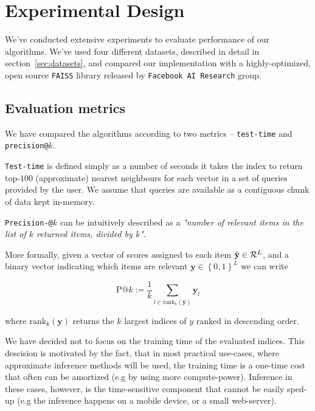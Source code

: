 
\section{Experimental Design}

    We've conducted extensive experiments to evaluate performance of our algorithms. We've used
    four different datasets, described in detail in section~\ref{sec:datasets}, and compared
    our implementation with a highly-optimized, open source \texttt{FAISS} library released by
    \texttt{Facebook AI Research} group.

    \subsection{Evaluation metrics}

        We have compared the algorithms according to two metrics -- \texttt{test-time}
        and \texttt{precision@}$k$.

        \texttt{Test-time} is defined simply as a number of seconds it takes the index to return
        top-$100$ (approximate) nearest neighbours for each vector in a set of queries provided by the user.
        We assume that queries are available as a contiguous chunk of data kept in-memory.

        \texttt{Precision-@}$k$ can be intuitively described as a
        \textit{"number of relevant items in the list of $k$ returned items, divided by $k$".}

        More formally, given a vector of scores assigned to each item $\hat{\mathbf y} \in {\cal{R}}^{L}$, and a
        binary vector indicating which items are relevant $\mathbf y \in \left\lbrace 0, 1 \right\rbrace^L$
        we can write

        \begin{equation}
            \text{P}@k := \frac{1}{k} \sum_{l\in \text{rank}_k (\hat{\mathbf y})} \mathbf y_l
        \end{equation}

        where $\text{rank}_k(\mathbf y)$ returns the $k$ largest indices of $y$ ranked in descending order.

        We have decided not to focus on the training time of the evaluated indices. This
        descision is motivated by the fact, that in most practical use-cases, where
        approximate inference methods will be used, the training time is a one-time cost that
        often can be amortized (e.g by using more compute-power).
        Inference in these cases, however, is the time-sensitive component
        that cannot be easily sped-up (e.g the inference happens on a mobile device, or a small web-server).


